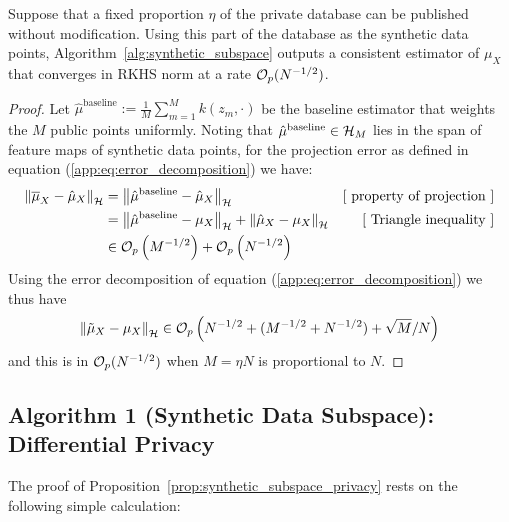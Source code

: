 \begin{hprop}[\ref{prop:alg1_rate_publishable_subset}]
Suppose that a fixed proportion $\eta$ of the private database can be published without modification. Using this part of the database as the synthetic data points, Algorithm~\ref{alg:synthetic_subspace} outputs a consistent estimator of $\mu_X$ that converges in RKHS norm at a rate $\mathcal{O}_p(N^{-1/2})$.
\begin{proof}
Let $\hat{\mu}^{\text{baseline}} := \frac{1}{M} \sum_{m = 1}^M k(z_m, \cdot)$ be the baseline estimator that weights the $M$ public points uniformly. Noting that $\hat{\mu}^{\text{baseline}} \in \mathcal{H}_M$ lies in the span of feature maps of synthetic data points, for the projection error as defined in equation (\ref{app:eq:error_decomposition}) we have:
\begin{align*}
\left\| \overline{\mu}_X - \hat{\mu}_X \right\|_{\mathcal{H}}
&=
\left\| \hat{\mu}^{\text{baseline}} - \hat{\mu}_X \right\|_{\mathcal{H}}
&\text{[ property of projection ]}
\\&=
\left\| \hat{\mu}^{\text{baseline}} - \mu_X \right\|_{\mathcal{H}}
+
\left\| \hat{\mu}_X - \mu_X \right\|_{\mathcal{H}}
&\text{[ Triangle inequality ]}
\\&\in
\mathcal{O}_p\left( M^{-1/2} \right) + \mathcal{O}_p\left( N^{-1/2} \right)
\end{align*}
Using the error decomposition of equation (\ref{app:eq:error_decomposition}) we thus have
\begin{equation*}
\left\| \tilde{\mu}_X - \mu_X \right\|_{\mathcal{H}}
\in
\mathcal{O}_p\left(
N^{-1/2} + (M^{-1/2} + N^{-1/2}) + \sqrt{M} / N
\right)
\end{equation*}
and this is in $\mathcal{O}_p(N^{-1/2})$ when $M = \eta N$ is proportional to $N$.
\end{proof}
\end{hprop}



\subsection{Algorithm 1 (Synthetic Data Subspace): Differential Privacy}
\label{app:sec:synthetic_subspace_privacy}

The proof of Proposition~\ref{prop:synthetic_subspace_privacy} rests on the following simple calculation:


